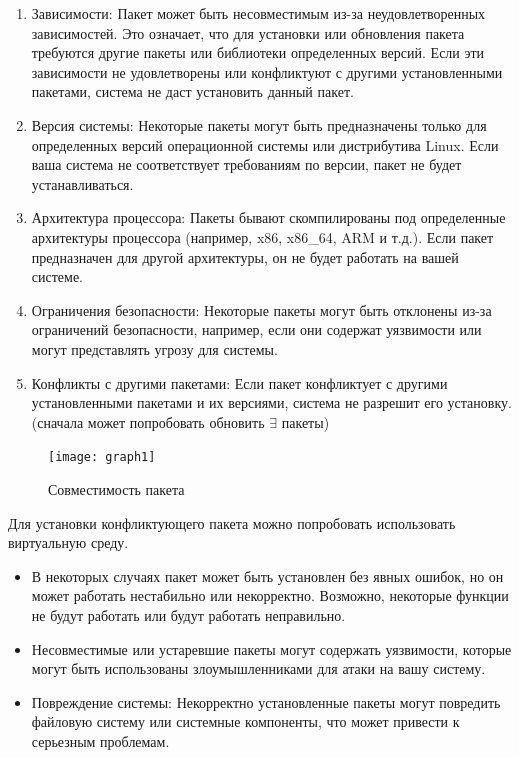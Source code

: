 \documentclass[oneside, final, 14pt]{extreport} %
\begin{document}
\begin{enumerate}
    \item Зависимости: Пакет может быть несовместимым из-за неудовлетворенных зависимостей. Это означает, что для установки или обновления пакета требуются другие пакеты или библиотеки определенных версий. Если эти зависимости не удовлетворены или конфликтуют с другими установленными пакетами, система не даст установить данный пакет.
    \item Версия системы: Некоторые пакеты могут быть предназначены только для определенных версий операционной системы или дистрибутива Linux. Если ваша система не соответствует требованиям по версии, пакет не будет устанавливаться.
    \item Архитектура процессора: Пакеты бывают скомпилированы под определенные архитектуры процессора (например, x86, x86\_64, ARM и т.д.). Если пакет предназначен для другой архитектуры, он не будет работать на вашей системе.
    \item Ограничения безопасности: Некоторые пакеты могут быть отклонены из-за ограничений безопасности, например, если они содержат уязвимости или могут представлять угрозу для системы.
    \item Конфликты с другими пакетами: Если пакет конфликтует с другими установленными пакетами и их версиями, система не разрешит его установку. (сначала может попробовать обновить $\exists$ пакеты)
\end{enumerate}

\begin{figure}
    \centering
    \texttt{[image: graph1]} %
    \caption{Совместимость пакета}
    \label{fig:основания}
\end{figure}



Для установки конфликтующего пакета можно попробовать использовать виртуальную среду.

\begin{itemize}
    \item В некоторых случаях пакет может быть установлен без явных ошибок, но он может работать нестабильно или некорректно. Возможно, некоторые функции не будут работать или будут работать неправильно.
    \item Несовместимые или устаревшие пакеты могут содержать уязвимости, которые могут быть использованы злоумышленниками для атаки на вашу систему.
    \item Повреждение системы: Некорректно установленные пакеты могут повредить файловую систему или системные компоненты, что может привести к серьезным проблемам.
\end{itemize}
\end{document}
